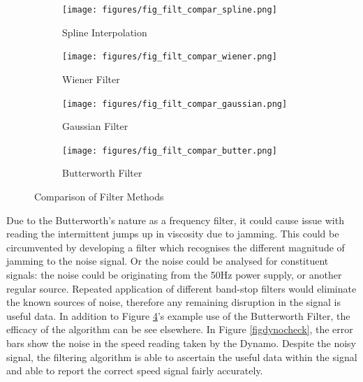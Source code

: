 \documentclass[twoside,a4]{report}
\def\br{\newline \newline \noindent}
\begin{document}
	\begin{figure}[!htb]
		\centering
		\begin{subfigure}[t]{0.22\textwidth}
			\centering
			\texttt{[image: figures/fig\_filt\_compar\_spline.png]}
			\caption{Spline Interpolation}
			\label{figfiltsp}
			\footnotesize
		\end{subfigure}
		\begin{subfigure}[t]{0.22\textwidth}
			\centering
			\texttt{[image: figures/fig\_filt\_compar\_wiener.png]}
			\caption{Wiener Filter}
			\label{figfiltwi}
			\footnotesize
		\end{subfigure}
		\begin{subfigure}[t]{0.22\textwidth}
			\centering
			\texttt{[image: figures/fig\_filt\_compar\_gaussian.png]}
			\caption{Gaussian Filter}
			\label{figfiltga}
			\footnotesize
		\end{subfigure}
		\begin{subfigure}[t]{0.22\textwidth}
			\centering
			\texttt{[image: figures/fig\_filt\_compar\_butter.png]}
			\caption{Butterworth Filter}
			\label{figfiltbu}
			\footnotesize
		\end{subfigure}
		\caption{Comparison of Filter Methods \label{figfiltcomp}}
	\end{figure}
	
	\noindent
	Due to the Butterworth's nature as a frequency filter, it could cause issue with reading the intermittent jumps up in viscosity due to jamming. This could be circumvented by developing a filter which recognises the different magnitude of jamming to the noise signal. Or the noise could be analysed for constituent signals: the noise could be originating from the 50Hz power supply, or another regular source. Repeated application of different band-stop filters would eliminate the known sources of noise, therefore any remaining disruption in the signal is useful data.
	\br
	In addition to Figure \ref{figfiltbu}'s example use of the Butterworth Filter, the efficacy of the algorithm can be see elsewhere. In Figure \ref{figdynocheck}, the error bars show the noise in the speed reading taken by the Dynamo. Despite the noisy signal, the filtering algorithm is able to ascertain the useful data within the signal and able to report the correct speed signal fairly accurately.
	
\end{document}
